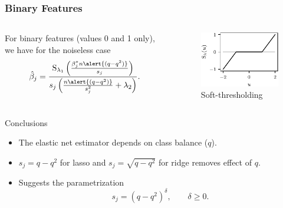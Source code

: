 \documentclass[10pt]{beamer}
\begin{document}
\begin{frame}[c]
  \frametitle{Binary Features}

  \begin{columns}
    \begin{column}{0.45\textwidth}

      For binary features (values 0 and 1 only), we have for the noiseless case
      \[
        \hat{\beta}_j =
        \frac{\operatorname{S}_{\lambda_1}\left(\frac{\beta_j^* n \alert{(q - q^2)}}{s_j}\right)}{s_j\left(\frac{n\alert{(q - q^2)}}{s_j^2} + \lambda_2\right)}.
      \]
    \end{column}
    \begin{column}{0.45\textwidth}
      \begin{figure}[htpb]
        \centering
        \includegraphics[]{images/paper6-st.pdf}
        \caption{%
          Soft-thresholding
        }
      \end{figure}
    \end{column}
  \end{columns}

  \pause

  \begin{block}{Conclusions}
    \begin{itemize}[<+->]
      \item The elastic net estimator depends on class balance (\(q\)).
      \item \(s_j = q - q^2\) for lasso and \(s_j = \sqrt{q-q^2}\) for ridge removes effect of \(q\).
      \item Suggests the parametrization
            \[
              s_j = (q - q^2)^\delta, \qquad \delta \geq 0.
            \]
    \end{itemize}
  \end{block}

\end{frame}
\end{document}

